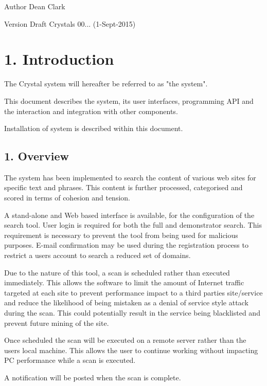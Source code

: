 

\begin{DoxyAuthor}{Author}
Dean Clark 
\end{DoxyAuthor}
\begin{DoxyVersion}{Version}
Draft Crystals 00... (1-\/\+Sept-\/2015)
\end{DoxyVersion}
\hypertarget{index_sec_1}{}\section{1. 	\+Introduction}\label{index_sec_1}
\begin{DoxyVerb}The Crystal system will hereafter be referred to as "the system".

This document describes the system, its user interfaces, programming API and the interaction 
and integration with other components.

Installation of system is described within this document. 
\end{DoxyVerb}
\hypertarget{index_sec_1_1}{}\subsection{1.	\+Overview}\label{index_sec_1_1}
\begin{DoxyVerb}The system has been implemented to search the content of various web sites for specific text
and phrases.  This content is further processed, categorised and scored in terms of cohesion and tension.

A stand-alone and Web based interface is available, for the configuration of the search tool.
User login is required for both the full and demonstrator search.  This requirement is 
necessary to prevent the tool from being used for malicious purposes.  E-mail confirmation 
may be used during the registration process to restrict a users account to search a reduced set of domains. 

Due to the nature of this tool, a scan is scheduled rather than executed immediately.  This allows the software
 to limit the amount of Internet traffic targeted at each site to prevent performance
impact to a third parties site/service and reduce the likelihood of being mistaken as a denial of service style
 attack during the scan.  This could potentially result in the service being blacklisted and prevent future 
 mining of the site.

Once scheduled the scan will be executed on a remote server rather than the users local machine.  
This allows the user to continue working without impacting PC performance while a scan is executed.

A notification will be posted when the scan is complete.
\end{DoxyVerb}


